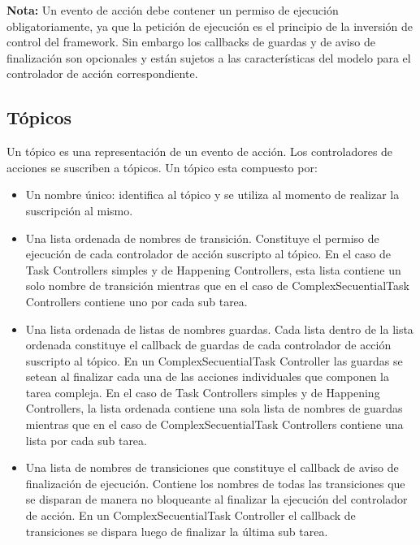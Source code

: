 \begin{framed}
\textbf{Nota:} Un evento de acción debe contener un permiso de ejecución
obligatoriamente, ya que la petición de ejecución es el principio de la
inversión de control del framework. Sin embargo los callbacks de guardas y de
aviso de finalización son opcionales y están sujetos a las características del
modelo para el controlador de acción correspondiente.
\end{framed}

\subsection{Tópicos}
Un tópico es una representación de un evento de acción. Los controladores de
acciones se suscriben a tópicos.
Un tópico esta compuesto por:
\begin{itemize}
  \item Un nombre único: identifica al tópico y se utiliza al momento de
  realizar la suscripción al mismo.
  \item Una lista ordenada de nombres de transición. Constituye el permiso
  de ejecución de cada controlador de acción suscripto al tópico. En el caso de
  Task Controllers simples y de Happening Controllers, esta lista contiene
  un solo nombre de transición mientras que en el caso de ComplexSecuentialTask
  Controllers contiene uno por cada sub tarea.
  \item Una lista ordenada de listas de nombres guardas. Cada lista
   dentro de la lista ordenada constituye el callback de guardas de cada
   controlador de acción suscripto al tópico. En un ComplexSecuentialTask
   Controller las guardas se setean al finalizar cada una de las acciones
   individuales que componen la tarea compleja. En el caso de
  Task Controllers simples y de Happening Controllers, la lista ordenada
  contiene una sola lista de nombres de guardas mientras que en el caso de
  ComplexSecuentialTask Controllers contiene una lista por cada sub tarea.
  \item Una lista de nombres de transiciones que constituye el callback de
  aviso de finalización de ejecución. Contiene los nombres de todas las
  transiciones que se disparan de manera no bloqueante al finalizar la ejecución
  del controlador de acción. En un  ComplexSecuentialTask
  Controller el callback de transiciones se dispara luego de finalizar la última
  sub tarea.
\end{itemize}

